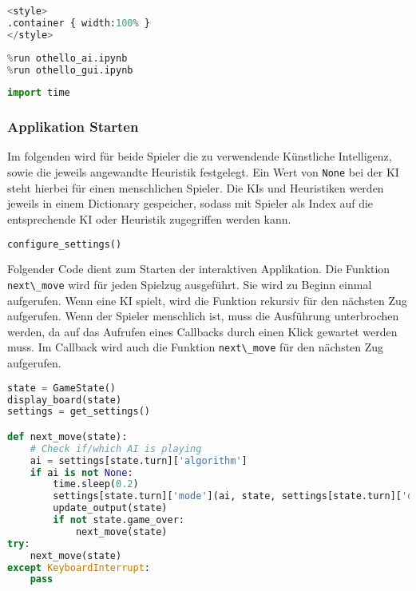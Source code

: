 \begin{lstlisting}[language=Python]
%%HTML
<style>
.container { width:100% }
</style>
\end{lstlisting}

\begin{lstlisting}[language=Python]
%run othello_game.ipynb
%run othello_ai.ipynb
%run othello_gui.ipynb
\end{lstlisting}

\begin{lstlisting}[language=Python]
import time
\end{lstlisting}

\hypertarget{applikation-starten}{%
\subsubsection{Applikation Starten}\label{applikation-starten}}

Im folgenden wird für beide Spieler die zu verwendende Künstliche
Intelligenz, sowie die jeweils angewandte Heuristik festgelegt. Ein Wert
von \passthrough{\lstinline!None!} bei der KI steht hierbei für einen
menschlichen Spieler. Die KIs und Heuristiken werden jeweils in einem
Dictionary gespeicher, sodass mit Spieler als Index auf die
entsprechende KI oder Heuristik zugegriffen werden kann.

\begin{lstlisting}[language=Python]
configure_settings()
\end{lstlisting}

Folgender Code dient zum Starten der interaktiven Applikation. Die
Funktion \passthrough{\lstinline!next\_move!} wird für jeden Spielzug
ausgeführt. Sie wird zu Beginn einmal aufgerufen. Wenn eine KI spielt,
wird die Funktion rekursiv für den nächsten Zug aufgerufen. Wenn der
Spieler menschlich ist, muss die Ausführung unterbrochen werden, da auf
das Aufrufen eines Callbacks durch einen Klick gewartet werden muss. Im
Callback wird auch die Funktion \passthrough{\lstinline!next\_move!} für
den nächsten Zug aufgerufen.

\begin{lstlisting}[language=Python]
state = GameState()
display_board(state)
settings = get_settings()

def next_move(state):
    # Check if/which AI is playing
    ai = settings[state.turn]['algorithm']
    if ai is not None:
        time.sleep(0.2)
        settings[state.turn]['mode'](ai, state, settings[state.turn]['depth'], settings[state.turn]['heuristic'])
        update_output(state)
        if not state.game_over:
            next_move(state)
try:
    next_move(state)
except KeyboardInterrupt:
    pass
\end{lstlisting}
